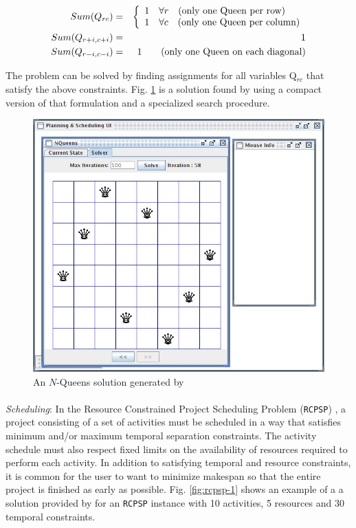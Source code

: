 {\begin{eqnarray*}
 Sum(Q_{rc}) & = & \left\{
   \begin{array}{l l}
     1 & \forall r \quad \mbox{(only one Queen per row)}\\
     1 & \forall c \quad \mbox{(only one Queen per column)}\\ 
   \end{array} \right. \\
Sum(Q_{r+i,c+i}) & = & 1\\
Sum(Q_{r-i,c-i}) & = & 1 \qquad \mbox{(only one Queen on each diagonal)}\\
\end{eqnarray*} 

The problem can be solved by finding assignments for all variables
Q$_{rc}$ that satisfy the above constraints. Fig. \ref{fig:nqueens-2}
is a solution found by \eu using a compact version of that formulation
and a specialized search procedure.

\begin{figure}
\centering
\includegraphics[scale=0.3]{figs/Example-NQueens1.jpg}
\caption{\small An $N$-Queens solution generated by \eu}
\label{fig:nqueens-2}
\end{figure}


\paragraph{} \textit{Scheduling}: In the Resource Constrained Project
Scheduling Problem (\texttt{RCPSP}) \cite{Bruckera99}, a project
consisting of a set of activities must be scheduled in a way that
satisfies minimum and/or maximum temporal separation constraints. The
activity schedule must also respect fixed limits on the availability
of resources required to perform each activity. In addition to
satisfying temporal and resource constraints, it is common for the
user to want to minimize makespan \cite{ghallab04} so that the entire
project is finished as early as possible. Fig. \ref{fig:rcpsp-1} shows
an example of a a solution provided by \eu for an \texttt{RCPSP}
instance with 10 activities, 5 resources and 30 temporal constraints.

}
